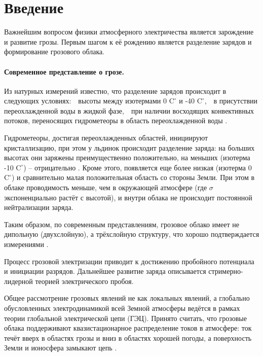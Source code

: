 \documentclass[a4paper,14pt]{extarticle}
\newcommand{\numb}[1]{\,\scalebox{0.8}{\textbf{(#1)}}\,}
\begin{document}


\tableofcontents
\newpage

\section*{Введение}

Важнейшим вопросом физики атмосферного электричества является зарождение и развитие грозы. Первым шагом к её рождению является разделение зарядов и формирование грозового облака.

\vspace{-1em}
\paragraph{Современное представление о грозе.} Из натурных измерений известно, что разделение зарядов происходит в следующих условиях: \numb{1} высоты между изотермами  0 $\text{C}^\circ$ и -40 $\text{C}^\circ$, \numb{2} в присутствии переохлажденной воды в жидкой фазе, \numb{3} при наличии восходящих конвективных потоков, переносящих гидрометеоры в область переохлажденной воды \cite{charge2}.

Гидрометеоры, достигая переохлажденных областей, инициируют кристаллизацию, при этом у льдинок происходит разделение заряда\footnotemark\hspace{0.02em}: на больших высотах они заряжены преимущественно положительно, на меньших (изотерма -10 $\text{C}^\circ$) -- отрицательно \cite{charge}.
Кроме этого, появляется еще более низкая (изотерма 0 $\text{C}^\circ$) и сравнительно малая положительная область со стороны Земли. При этом в облаке проводимость меньше, чем в окружающей атмосфере (где $\sigma$ экспоненциально растёт с высотой), и внутри облака не происходит постоянной нейтрализации заряда. 

Таким образом, по современным представлениям, грозовое облако имеет не
дипольную (двухслойную), а трёхслойную структуру, что хорошо подтверждается измерениями \cite{th1}.

Процесс грозовой электризации приводит к достижению пробойного потенциала и инициации разрядов. Дальнейшее развитие заряда описывается стримерно-лидерной теорией электрического пробоя.

Общее рассмотрение грозовых явлений не как локальных явлений, а глобально обусловленных электродинамикой всей Земной атмосферы ведётся в рамках теории глобальной электрической цепи (ГЭЦ). Принято считать, что грозовые облака поддерживают квазистационарное распределение токов в атмосфере: ток течёт вверх в областях грозы и вниз в областях хорошей погоды, а поверхность Земли и ионосфера замыкают цепь \cite{gec}. 
\vspace{-1em}
\end{document}
